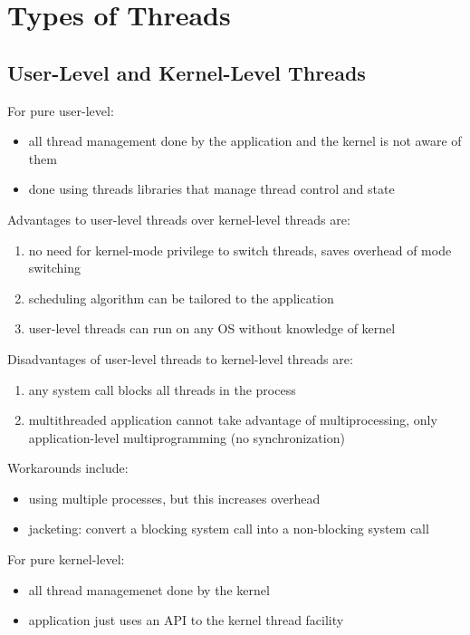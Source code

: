 \documentclass[11pt]{article}
\begin{document}
\section{Types of Threads}
\label{sec:org102a4ea}
\subsection{User-Level and Kernel-Level Threads}
\label{sec:orgd8b0da0}
For pure user-level:
\begin{itemize}
\item all thread management done by the application and the kernel is not aware of them
\item done using threads libraries that manage
thread control and state
\end{itemize}

Advantages to user-level threads over
kernel-level threads are:
\begin{enumerate}
\item no need for kernel-mode privilege to switch threads,
saves overhead of mode switching
\item scheduling algorithm can be tailored to the application
\item user-level threads can run on any OS without knowledge
of kernel
\end{enumerate}

Disadvantages of user-level threads to
kernel-level threads are:
\begin{enumerate}
\item any system call blocks all threads in the process
\item multithreaded application cannot take advantage of
multiprocessing, only application-level multiprogramming
(no synchronization)
\end{enumerate}

Workarounds include:
\begin{itemize}
\item using multiple processes, but this increases overhead
\item jacketing: convert a blocking system call into a non-blocking
system call
\end{itemize}

For pure kernel-level:
\begin{itemize}
\item all thread managemenet done by the kernel
\item application just uses an API to the kernel thread facility
\end{itemize}
\end{document}
